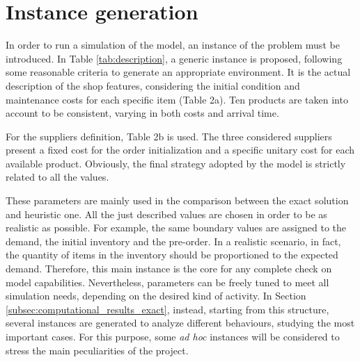 \documentclass{article}
\begin{document}
\section{Instance generation}\label{sec:instance}
In order to run a simulation of the model, an instance of the problem must be introduced. In Table \ref{tab:description}, a generic instance is proposed, following some reasonable criteria to generate an appropriate environment. It is the actual description of the shop features, considering the initial condition and maintenance costs for each specific item (Table 2a). Ten products are taken into account to be consistent, varying in both costs and arrival time. \par
For the suppliers definition, Table 2b is used. The three considered suppliers present a fixed cost for the order initialization and a specific unitary cost for each available product. Obviously, the final strategy adopted by the model is strictly related to all the values. \par
These parameters are mainly used in the comparison between the exact solution and heuristic one. 
All the just described values are chosen in order to be as realistic as possible. For example, the same boundary values are assigned to the demand, the initial inventory and the pre-order. In a realistic scenario, in fact, the quantity of items in the inventory should be proportioned to the expected demand. Therefore, this main instance is the core for any complete check on model capabilities. Nevertheless, parameters can be freely tuned to meet all simulation needs, depending on the desired kind of activity. In Section \ref{subsec:computational_results_exact}, instead, starting from this structure, several instances are generated to analyze different behaviours, studying the most important cases. For this purpose, some \textit{ad hoc} instances will be considered to stress the main peculiarities of the project.
\end{document}
